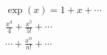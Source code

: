 $
      \begin{multline*}
      \exp(x) = 1 + x + \cdots \\
      \frac{x^4}4 + \frac{x^5}{5!} + \cdots \\
      \cdots + \frac{x^n}{n!} + \cdots
      \end{multline*}
$
